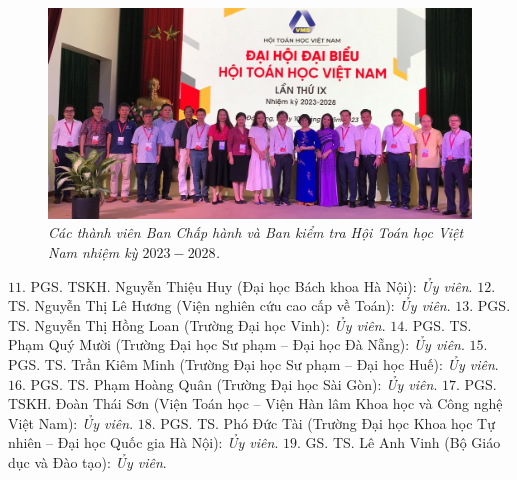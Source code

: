 	\begin{figure}[H]
		\vspace*{5pt}
		\centering
		\captionsetup{labelformat= empty, justification=centering}
		\includegraphics[width= 1\linewidth]{1}
		\caption{\small\textit{\color{doisongtoanhoc}Các thành viên Ban Chấp hành và Ban kiểm tra Hội Toán học Việt Nam nhiệm kỳ $2023 - 2028$.}}
		\vspace*{-10pt}
	\end{figure}
	\begin{multicols}{2}
	$11.$	PGS. TSKH. Nguyễn Thiệu Huy (Đại học Bách khoa Hà Nội): \textit{Ủy viên}.
	\vskip 0.1cm
	$12.$	TS. Nguyễn Thị Lê Hương (Viện nghiên cứu cao cấp về Toán): \textit{Ủy viên}.
	\vskip 0.1cm
	$13.$	PGS. TS. Nguyễn Thị Hồng Loan (Trường Đại học Vinh): \textit{Ủy viên}.
	\vskip 0.1cm
	$14.$	PGS. TS. Phạm Quý Mười (Trường Đại học Sư phạm -- Đại học Đà Nẵng): \textit{Ủy viên}.
	\vskip 0.1cm
	$15.$	PGS. TS. Trần Kiêm Minh (Trường Đại học Sư phạm -- Đại học Huế): \textit{Ủy viên}.
	\vskip 0.1cm
	$16.$	PGS. TS. Phạm Hoàng Quân (Trường Đại học Sài Gòn): \textit{Ủy viên}.
	\vskip 0.1cm
	$17.$	PGS. TSKH. Đoàn Thái Sơn (Viện Toán học -- Viện Hàn lâm Khoa học và Công nghệ Việt Nam): \textit{Ủy viên}.
	\vskip 0.1cm
	$18.$	PGS. TS. Phó Đức Tài (Trường Đại học Khoa học Tự nhiên -- Đại học Quốc gia Hà Nội): \textit{Ủy viên}.
	\vskip 0.1cm
	$19.$	GS. TS. Lê Anh Vinh (Bộ Giáo dục và Đào tạo): \textit{Ủy viên}. 
\end{multicols}
